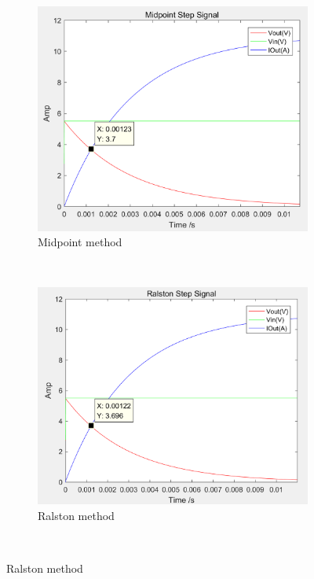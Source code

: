 \documentclass[a4paper, 12pt]{article}
\begin{document}
\begin{figure}
      \centering
      \begin{subfigure}[b]{0.4\textwidth}
            \includegraphics[width=\textwidth]{ex1/midpoint_step.PNG}
            \caption{Midpoint method}
      \end{subfigure}
      ~
      \begin{subfigure}[b]{0.4\textwidth}
            \includegraphics[width=\textwidth]{ex1/ralston_step.PNG}
            \caption{Ralston method}
      \end{subfigure}
      ~

\end{figure}
\end{document}
